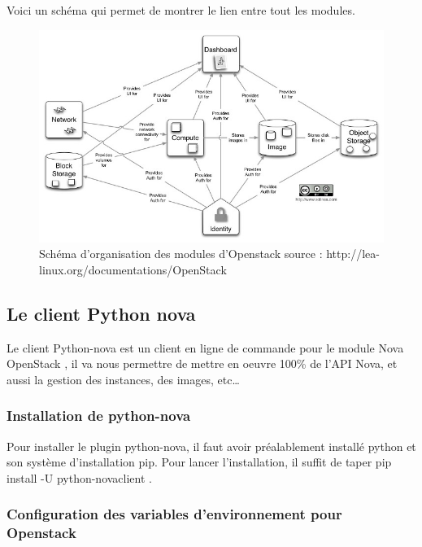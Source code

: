 \documentclass[]{article}
\begin{document}
Voici un schéma qui permet de montrer le lien entre tout les modules.

\begin{figure}
\centering
\includegraphics{Images/Openstack_diagramme_conceptuel.jpg}
\caption{Schéma d'organisation des modules d'Openstack \footnotesize{source : http://lea-linux.org/documentations/OpenStack} }
\end{figure}

\subsection{Le client Python nova}\label{le-client-python-nova}

Le client Python-nova est un client en ligne de commande pour le module
Nova OpenStack , il va nous permettre de mettre en oeuvre 100\% de l'API
Nova, et aussi la gestion des instances, des images, etc\ldots{}

\subsubsection{Installation de
python-nova}\label{installation-de-python-nova}

Pour installer le plugin python-nova, il faut avoir préalablement
installé python et son système d'installation pip. Pour lancer
l'installation, il suffit de taper pip install -U python-novaclient .

\subsubsection{Configuration des variables d'environnement pour
Openstack}\label{configuration-des-variables-denvironnement-pour-openstack}
\end{document}
